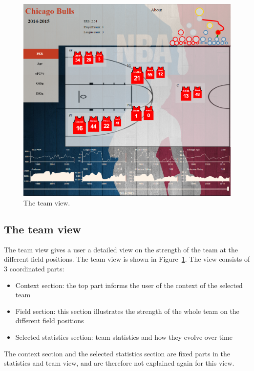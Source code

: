 \documentclass[]{sigchi}
\begin{document}
\begin{figure}
\centering
  \includegraphics[width=1.0\columnwidth]{figures/teamview}
  \caption{The team view.}
  \label{fig:teamview}
\end{figure}

\subsection{The team view}
The team view gives a user a detailed view on the strength of the team at the 
different field positions. The team view is shown in Figure~\ref{fig:teamview}. 
The view consists of 3 coordinated parts:
\begin{itemize}
    \item Context section: the top part informs the user of the context of the
        selected team
    \item Field section: this section illustrates the strength of the whole team on
        the different field positions
    \item Selected statistics section: team statistics and how they evolve over
        time
\end{itemize}
The context section and the selected statistics section are fixed parts in the 
statistics and team view, and are therefore not explained again for this view.
\end{document}
